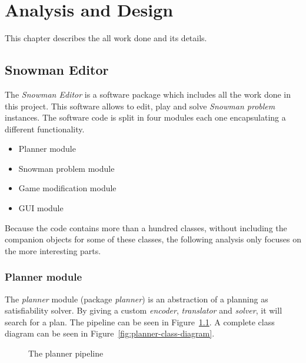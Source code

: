 \documentclass{report}
\theoremstyle{plain}
\begin{document}
\chapter{Analysis and Design}
This chapter describes the all work done and its details.

\section{Snowman Editor}
The \emph{Snowman Editor} is a software package which includes all the work done in this project. This software allows to edit, play and solve \emph{Snowman problem} instances. The software code is split in four modules each one encapsulating a different functionality.
\begin{itemize}
    \item Planner module
    \item Snowman problem module
    \item Game modification module
    \item GUI module
\end{itemize}

Because the code contains more than a hundred classes, without including the companion objects for some of these classes, the following analysis only focuses on the more interesting parts. 

\subsection{Planner module}
The \emph{planner} module (package \emph{planner}) is an abstraction of a planning as satisfiability solver. By giving a custom \emph{encoder}, \emph{translator} and \emph{solver}, it will search for a plan. The pipeline can be seen in Figure~\ref{fig:pipeline}. A complete class diagram can be seen in Figure~\ref{fig:planner-class-diagram}.

\begin{figure}
    
    
    \vspace{1\baselineskip}
    
    \begin{center}
    \hspace*{\fill} 
    \end{center}
    
    \vspace{1\baselineskip}

    \caption{The planner pipeline}
    \label{fig:pipeline}
\end{figure}
\end{document}
